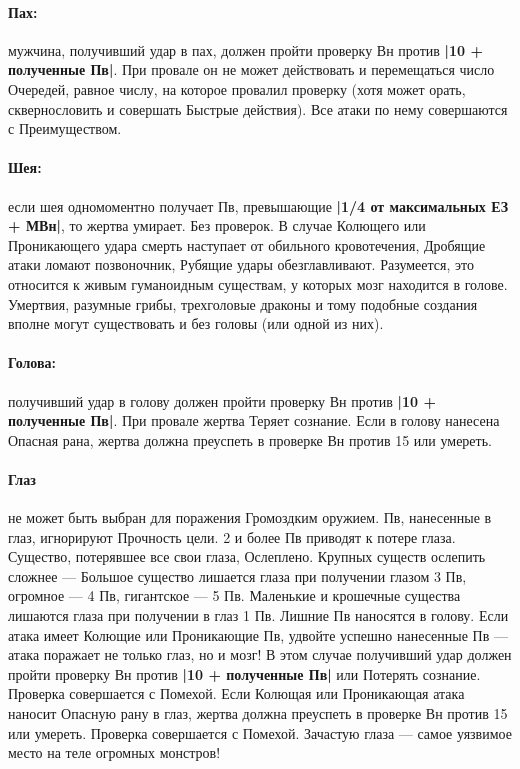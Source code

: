 \paragraph{Пах:} мужчина, получивший удар в пах, должен пройти проверку Вн против \textbf{|10 + полученные Пв|}. При провале он не может действовать и перемещаться число Очередей, равное числу, на которое провалил проверку (хотя может орать, сквернословить и совершать Быстрые действия). Все атаки по нему совершаются с Преимуществом.
\paragraph{Шея:} если шея одномоментно получает Пв, превышающие \textbf{|1/4 от максимальных ЕЗ + МВн|}, то жертва умирает. Без проверок. В случае Колющего или Проникающего удара смерть наступает от обильного кровотечения, Дробящие атаки ломают позвоночник, Рубящие удары обезглавливают.
\newline
Разумеется, это относится к живым гуманоидным существам, у которых мозг находится в голове. Умертвия, разумные грибы, трехголовые драконы и тому подобные создания вполне могут существовать и без головы (или одной из них).
\paragraph{Голова:} получивший удар в голову должен пройти проверку Вн против \textbf{|10 + полученные Пв|}. При провале жертва Теряет сознание. Если в голову нанесена Опасная рана, жертва должна преуспеть в проверке Вн против 15 или умереть.
\paragraph{Глаз} не может быть выбран для поражения Громоздким оружием. Пв, нанесенные в глаз, игнорируют Прочность цели. 2 и более Пв приводят к потере глаза. Существо, потерявшее все свои глаза, Ослеплено. Крупных существ ослепить сложнее — Большое существо лишается глаза при получении глазом 3 Пв, огромное — 4 Пв, гигантское — 5 Пв. Маленькие и крошечные существа лишаются глаза при получении в глаз 1 Пв. Лишние Пв наносятся в голову.
\newline
Если атака имеет Колющие или Проникающие Пв, удвойте успешно нанесенные Пв — атака поражает не только глаз, но и мозг! В этом случае получивший удар должен пройти проверку Вн против \textbf{|10 + полученные Пв|} или Потерять сознание. Проверка совершается с Помехой.
\newline
Если Колющая или Проникающая атака наносит Опасную рану в глаз, жертва должна преуспеть в проверке Вн против 15 или умереть. Проверка совершается с Помехой.
\newline
Зачастую глаза — самое уязвимое место на теле огромных монстров!